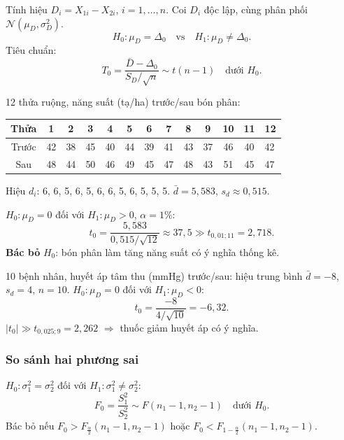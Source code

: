 \documentclass[12pt,a4paper]{article}
\begin{document}
\begin{phuongphap}[title={Kiểm định t cặp đôi}]
  Tính hiệu $D_i = X_{1i} - X_{2i}$, $i=1,\ldots,n$. Coi $D_i$ độc lập, cùng phân phối $\mathcal{N}(\mu_D, \sigma_D^2)$.
  \[
    H_0: \mu_D = \Delta_0 \quad \text{vs} \quad H_1: \mu_D \ne \Delta_0.
  \]
  Tiêu chuẩn:
  \[
    T_0 = \dfrac{\bar{D} - \Delta_0}{S_D/\sqrt{n}} \sim t(n-1) \quad \text{dưới } H_0.
  \]
\end{phuongphap}

\begin{vidu}[title={Kiểm định cặp - chế độ chăm bón}]
12 thửa ruộng, năng suất (tạ/ha) trước/sau bón phân:
\begin{center}
\begin{tabular}{cccccccccccc}
\toprule
Thửa & 1 & 2 & 3 & 4 & 5 & 6 & 7 & 8 & 9 & 10 & 11 & 12 \\
\midrule
Trước & 42 & 38 & 45 & 40 & 44 & 39 & 41 & 43 & 37 & 46 & 40 & 42 \\
Sau & 48 & 44 & 50 & 46 & 49 & 45 & 47 & 48 & 43 & 51 & 45 & 47 \\
\bottomrule
\end{tabular}
\end{center}
Hiệu $d_i$: 6, 6, 5, 6, 5, 6, 6, 5, 6, 5, 5, 5. $\bar{d} = 5{,}583$, $s_d \approx 0{,}515$.

$H_0: \mu_D = 0$ đối với $H_1: \mu_D > 0$, $\alpha=1\%$:
\[
  t_0 = \dfrac{5{,}583}{0{,}515/\sqrt{12}} \approx 37{,}5 \gg t_{0{,}01;11} = 2{,}718.
\]
\textbf{Bác bỏ} $H_0$: bón phân làm tăng năng suất có ý nghĩa thống kê.
\end{vidu}

\begin{vidu}[title={Kiểm định cặp - huyết áp trước/sau thuốc}]
10 bệnh nhân, huyết áp tâm thu (mmHg) trước/sau: hiệu trung bình $\bar{d} = -8$, $s_d = 4$, $n=10$.
$H_0: \mu_D = 0$ đối với $H_1: \mu_D < 0$:
\[
  t_0 = \dfrac{-8}{4/\sqrt{10}} = -6{,}32.
\]
$|t_0| \gg t_{0{,}025;9} = 2{,}262$ $\Rightarrow$ thuốc giảm huyết áp có ý nghĩa.
\end{vidu}

\subsubsection{So sánh hai phương sai}

\begin{congthuc}[title={Kiểm định F}]
  $H_0: \sigma_1^2 = \sigma_2^2$ đối với $H_1: \sigma_1^2 \ne \sigma_2^2$:
  \[
    F_0 = \dfrac{S_1^2}{S_2^2} \sim F(n_1-1, n_2-1) \quad \text{dưới } H_0.
  \]
  Bác bỏ nếu $F_0 > F_{\frac{\alpha}{2}}(n_1-1, n_2-1)$ hoặc $F_0 < F_{1-\frac{\alpha}{2}}(n_1-1, n_2-1)$.
\end{congthuc}
\end{document}
